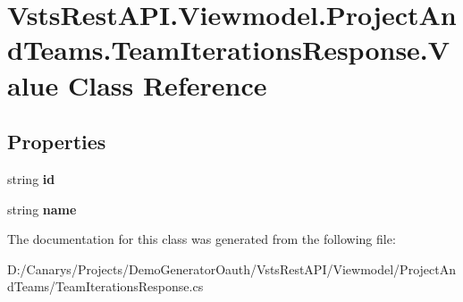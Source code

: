 \hypertarget{class_vsts_rest_a_p_i_1_1_viewmodel_1_1_project_and_teams_1_1_team_iterations_response_1_1_value}{}\section{Vsts\+Rest\+A\+P\+I.\+Viewmodel.\+Project\+And\+Teams.\+Team\+Iterations\+Response.\+Value Class Reference}
\label{class_vsts_rest_a_p_i_1_1_viewmodel_1_1_project_and_teams_1_1_team_iterations_response_1_1_value}
\subsection*{Properties}
\begin{DoxyCompactItemize}
\item 
\mbox{\label{class_vsts_rest_a_p_i_1_1_viewmodel_1_1_project_and_teams_1_1_team_iterations_response_1_1_value_a4f201b177a24d28a3d4b8c7010af3aaf}} 
string {\bfseries id}
\item 
\mbox{\label{class_vsts_rest_a_p_i_1_1_viewmodel_1_1_project_and_teams_1_1_team_iterations_response_1_1_value_afcb825dddcf28d63d9c9bcad4a87c4ff}} 
string {\bfseries name}
\end{DoxyCompactItemize}


The documentation for this class was generated from the following file\+:\begin{DoxyCompactItemize}
\item 
D\+:/\+Canarys/\+Projects/\+Demo\+Generator\+Oauth/\+Vsts\+Rest\+A\+P\+I/\+Viewmodel/\+Project\+And\+Teams/Team\+Iterations\+Response.\+cs\end{DoxyCompactItemize}
